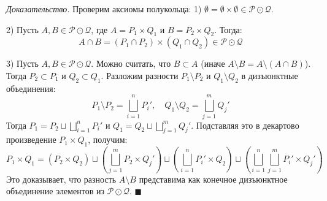 \documentclass[12pt,a4paper]{article}
\newenvironment{Proof}[1][Доказательство]{\vspace{0.5em}\noindent\textit{#1.}\hspace{0.5em}\ignorespaces}{\hfill$\blacksquare$\vspace{1em}}
\begin{document}
\begin{Proof}
Проверим аксиомы полукольца:
1) $\emptyset = \emptyset \times \emptyset \in \mathcal{P} \odot \mathcal{Q}$.

2) Пусть $A, B \in \mathcal{P} \odot \mathcal{Q}$, где $A = P_1 \times Q_1$ и $B = P_2 \times Q_2$. Тогда:
$$ A \cap B = (P_1 \cap P_2) \times (Q_1 \cap Q_2) \in \mathcal{P} \odot \mathcal{Q} $$

3) Пусть $A, B \in \mathcal{P} \odot \mathcal{Q}$. Можно считать, что $B \subset A$ (иначе $A \setminus B = A \setminus (A \cap B)$).
Тогда $P_2 \subset P_1$ и $Q_2 \subset Q_1$. Разложим разности $P_1 \setminus P_2$ и $Q_1 \setminus Q_2$ в дизъюнктные объединения:
$$ P_1 \setminus P_2 = \bigsqcup\limits_{i=1}^n P_i', \quad Q_1 \setminus Q_2 = \bigsqcup\limits_{j=1}^m Q_j' $$
Тогда $P_1 = P_2 \sqcup \bigsqcup\limits_{i=1}^n P_i'$ и $Q_1 = Q_2 \sqcup \bigsqcup\limits_{j=1}^m Q_j'$. 
Подставляя это в декартово произведение $P_1 \times Q_1$, получим:
$$ P_1 \times Q_1 = (P_2 \times Q_2) \sqcup \left( \bigsqcup\limits_{j=1}^m P_2 \times Q_j' \right) \sqcup \left( \bigsqcup\limits_{i=1}^n P_i' \times Q_2 \right) \sqcup \left( \bigsqcup\limits_{i=1}^n \bigsqcup\limits_{j=1}^m P_i' \times Q_j' \right) $$
Это доказывает, что разность $A \setminus B$ представима как конечное дизъюнктное объединение элементов из $\mathcal{P} \odot \mathcal{Q}$.
\end{Proof}
\end{document}
